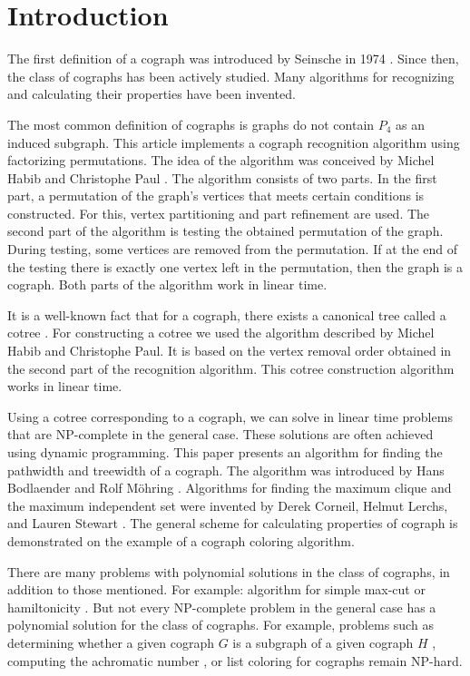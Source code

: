 \label{Definitions}
\section{Introduction}

The first definition of a cograph was introduced by Seinsche in 1974 \cite{Seinsche1974OnAP}. Since then, the class of cographs has been actively studied. Many algorithms for recognizing and calculating their properties have been invented.

The most common definition of cographs is graphs do not contain $P_4$ as an induced subgraph. This article implements a cograph recognition algorithm using factorizing permutations. The idea of the algorithm was conceived by Michel Habib and Christophe Paul \cite{HABIB2005183}. The algorithm consists of two parts. In the first part, a permutation of the graph's vertices that meets certain conditions is constructed. For this, vertex partitioning and part refinement are used. The second part of the algorithm is testing the obtained permutation of the graph. During testing, some vertices are removed from the permutation. If at the end of the testing there is exactly one vertex left in the permutation, then the graph is a cograph. Both parts of the algorithm work in linear time.

It is a well-known fact that for a cograph, there exists a canonical tree called a cotree \cite{CORNEIL1981163}. For constructing a cotree we used the algorithm described by Michel Habib and Christophe Paul. It is based on the vertex removal order obtained in the second part of the recognition algorithm. This cotree construction algorithm works in linear time.

Using a cotree corresponding to a cograph, we can solve in linear time problems that are NP-complete in the general case. These solutions are often achieved using dynamic programming. This paper presents an algorithm for finding the pathwidth and treewidth of a cograph. The algorithm was introduced by Hans Bodlaender and Rolf Möhring \cite{Sumner1974DaceyG}. Algorithms for finding the maximum clique and the maximum independent set were invented by Derek Corneil, Helmut Lerchs, and  Lauren Stewart \cite{CORNEIL1981163}. The general scheme for calculating properties of cograph is demonstrated on the example of a cograph coloring algorithm. 

There are many problems with polynomial solutions in the class of cographs, in addition to those mentioned. For example: algorithm for simple max-cut \cite{Bodlaender1994OnTC}  or hamiltonicity \cite{corneil_lerchs_stewart_81}.
But not every NP-complete problem in the general case has a polynomial solution for the class of cographs. For example, problems such as determining whether a given cograph $G$ is a subgraph of a given cograph $H$ \cite{damaschke_91}, computing the achromatic number \cite{Bodlaender1989AchromaticNI}, or list coloring \cite{Jansen1992GeneralizedCF} for cographs remain NP-hard.

